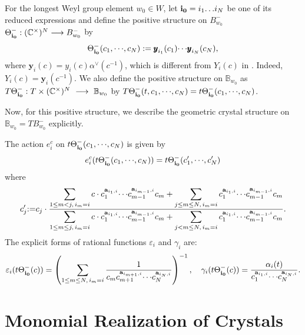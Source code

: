 For the  longest Weyl group element $w_0\in W$, let 
$\bfii0=i_1{\ldots} i_N$ be one of its reduced expressions and 
define the positive structure on $B^-_{w_0}$ 
$\Theta^-_\bfii0:({\mathbb C}^\times)^N\longrightarrow B^-_{w_0}$ by 
\[
 \Theta^-_\bfii0(c_1,{\cdots},c_N):={\pmb y}_{i_1}(c_1){\cdots} {\pmb y}_{i_N}(c_N),
\]
where ${\pmb y}_i(c)=y_i(c){\alpha}^\vee(c^{-1})$, 
which is different from $Y_i(c)$ in 
\cite{N,N2,KNO,KNO2}. Indeed, $Y_i(c)={\pmb y}_i(c^{-1})$.
We also define the positive structure on ${\mathbb B}_{w_0}$ as
$T\Theta^-_\bfii0:T\times({\mathbb C}^\times)^N\,\,\longrightarrow\,\,{\mathbb B}_{w_0}$  
by $T\Theta^-_\bfii0(t,c_1,{\cdots},c_N)
=t\Theta^-_\bfii0(c_1,{\cdots},c_N)$.

Now, for this positive structure, we describe the geometric crystal
structure on ${\mathbb B}_{w_0}=TB^-_{w_0}$ explicitly.
\begin{pro}[\cite{N4}]
The action $e^c_i$ on 
$t\Theta^-_{\bfii0}(c_1,{\cdots},c_N)$ is given by
\[
e_i^c(t\Theta^-_{\bfii0}(c_1,{\cdots},c_N))
=t\Theta^-_{\bfii0}(c'_1,{\cdots},c'_N)
\]
where
\begin{equation}
c'_j{\mathbin{:=}} 
c_j\cdot \frac{\displaystyle \sum_{1\leq m< j,\,i_m=i}
{c\cdot c_1^{{\bf a}_{i_1,i}}{\cdots} c_{m-1}^{{\bf a}_{i_{m-1},i}}c_m}
+\sum_{j\leq m\leq N,\,i_m=i} 
{c_1^{{\bf a}_{i_1,i}}{\cdots} c_{m-1}^{{\bf a}_{i_{m-1},i}}c_m}}
{\displaystyle \sum_{1\leq m\leq j,\,i_m=i} 
{c\cdot c_1^{{\bf a}_{i_1,i}}{\cdots} c_{m-1}^{{\bf a}_{i_{m-1},i}}c_m}+
\mathop\sum_{j< m\leq N,\,i_m=i}  
{c_1^{{\bf a}_{i_1,i}}{\cdots} c_{m-1}^{{\bf a}_{i_{m-1},i}}c_m}}.
\label{eici}
\end{equation}
The explicit forms of 
rational functions ${\varepsilon}_i$ and $\gamma_i$ are:
\begin{equation}
 {\varepsilon}_i(t\Theta^-_{\bfii0}(c))=
\left(\sum_{1\leq m\leq N,\,i_m=i} \frac{1}
{c_mc_{m+1}^{{\bf a}_{i_{m+1},i}}{\cdots} c_{N}^{{\bf a}_{i_{N},i}}}\right)^{-1},{\quad}
\gamma_i(t\Theta^-_{\bfii0}(c))
=\frac{{\alpha}_i(t)}{c_1^{{\bf a}_{i_1,i}}{\cdots} c_N^{{\bf a}_{i_N,i}}}.
\label{th-vep-gamma}
\end{equation}
\end{pro}

\section{Monomial Realization of Crystals}
\label{sect-mono}
\setcounter{equation}{0}

